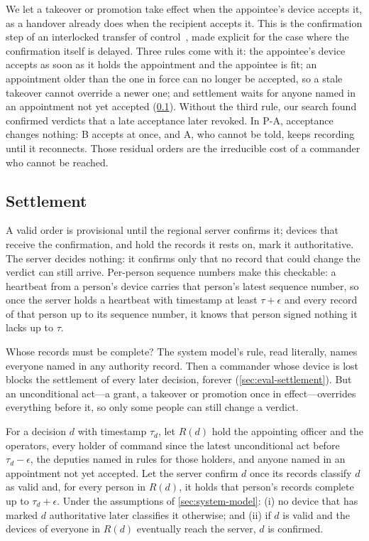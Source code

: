 We let a takeover or promotion take effect when the appointee's device accepts it, as a
handover already does when the recipient accepts it. This is the confirmation step of an
interlocked transfer of control~\cite{flemisch2012balance,gil2019designing}, made explicit
for the case where the confirmation itself is delayed. Three rules come with it: the
appointee's device accepts as soon as it holds the appointment and the appointee is fit; an
appointment older than the one in force can no longer be accepted, so a stale takeover
cannot override a newer one; and settlement waits for anyone named in an appointment not
yet accepted (\cref{sec:settlement}). Without the third rule, our search found confirmed
verdicts that a late acceptance later revoked. In P-A, acceptance changes nothing: B
accepts at once, and A, who cannot be told, keeps recording until it reconnects. Those
residual orders are the irreducible cost of a commander who cannot be reached.

\subsection{Settlement}
\label{sec:settlement}

A valid order is provisional until the regional server confirms it; devices that receive
the confirmation, and hold the records it rests on, mark it authoritative. The server
decides nothing: it confirms only that no record that could change the verdict can still
arrive. Per-person sequence numbers make this checkable: a heartbeat from a person's
device carries that person's latest sequence number, so once the server holds a heartbeat
with timestamp at least $\tau + \epsilon$ and every record of that person up to its sequence
number, it knows that person signed nothing it lacks up to $\tau$.

Whose records must be complete? The system model's rule, read literally, names everyone
named in any authority record. Then a commander whose device is lost blocks the settlement
of every later decision, forever (\cref{sec:eval-settlement}). But an unconditional
act---a grant, a takeover or promotion once in effect---overrides everything before it, so
only some people can still change a verdict.

\begin{proposition}[Settlement]
\label{prop:settlement}
For a decision $d$ with timestamp $\tau_d$, let $R(d)$ hold the appointing officer and the
operators, every holder of command since the latest unconditional act before
$\tau_d - \epsilon$, the deputies named in rules for those holders, and anyone named in an
appointment not yet accepted. Let the server confirm $d$ once its records classify $d$ as
valid and, for every person in $R(d)$, it holds that person's records complete up to
$\tau_d + \epsilon$. Under the assumptions of \cref{sec:system-model}:
(i) no device that has marked $d$ authoritative later classifies it otherwise; and
(ii) if $d$ is valid and the devices of everyone in $R(d)$ eventually reach the server, $d$
is confirmed.
\end{proposition}

